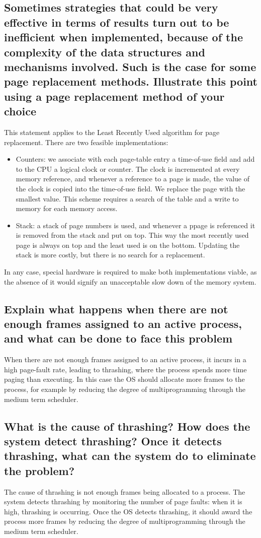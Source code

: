 \documentclass{article}
\begin{document}
\subsection{Sometimes strategies that could be very effective in terms of results turn out to be inefficient when implemented, because of the complexity of the data structures and mechanisms involved. Such is the case for some page replacement methods. Illustrate this point using a page replacement method of your choice}
This statement applies to the Least Recently Used algorithm for page replacement. There are two feasible implementations:
\begin{itemize}
    \item Counters: we associate with each page-table entry a time-of-use field and add to the CPU a logical clock or counter. The clock is incremented at every memory reference, and whenever a reference to a page is made, the value of the clock is copied into the time-of-use field. We replace the page with the smallest value. This scheme requires a search of the table and a write to memory for each memory access.
    \item Stack: a stack of page numbers is used, and whenever a ppage is referenced it is removed from the stack and put on top. This way the most recently used page is always on top and the least used is on the bottom. Updating the stack is more costly, but there is no search for a replacement.
\end{itemize}
In any case, special hardware is required to make both implementations viable, as the absence of it would signify an unacceptable slow down of the memory system.
\subsection{Explain what happens when there are not enough frames assigned to an active process, and what can be done to face this problem}
When there are not enough frames assigned to an active process, it incurs in a high page-fault rate, leading to thrashing, where the process spends more time paging than executing. In this case the OS should allocate more frames to the process, for example by reducing the degree of multiprogramming through the medium term scheduler.

\subsection{What is the cause of thrashing? How does the system detect thrashing? Once it detects thrashing, what can the system do to eliminate the problem?}
The cause of thrashing is not enough frames being allocated to a process. The system detects thrashing by monitoring the number of page faults: when it is high, thrashing is occurring. Once the OS detects thrashing, it should award the process more frames by reducing the degree of multiprogramming through the medium term scheduler.
\end{document}
